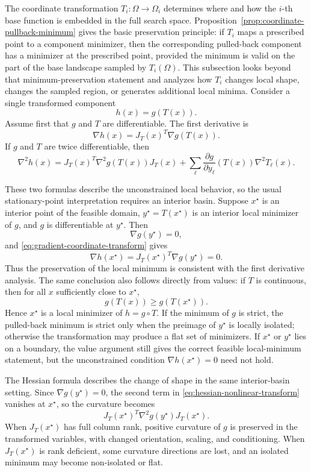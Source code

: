 \documentclass[11pt,a4paper]{article}
\theoremstyle{remark}
\theoremstyle{plain}
\begin{document}
The coordinate transformation \(T_i:\Omega\to\Omega_i\) determines where and how
the \(i\)-th base function is embedded in the full search space.
Proposition~\ref{prop:coordinate-pullback-minimum} gives the basic preservation
principle: if \(T_i\) maps a prescribed point to a component minimizer, then
the corresponding pulled-back component has a minimizer at the prescribed
point, provided the minimum is valid on the part of the base landscape sampled
by \(T_i(\Omega)\). This subsection looks beyond that minimum-preservation
statement and analyzes how \(T_i\) changes local shape, changes the sampled
region, or generates additional local minima.
Consider a single transformed component
\[
h(x)=g(T(x)).
\]
Assume first that \(g\) and \(T\) are differentiable. The first derivative is
\begin{equation}
	\nabla h(x)=J_T(x)^T\nabla g(T(x)).
	\label{eq:gradient-coordinate-transform}
\end{equation}
If \(g\) and \(T\) are twice differentiable, then
\begin{equation}
	\nabla^2 h(x)
	=
	J_T(x)^T\nabla^2 g(T(x))J_T(x)
	+
	\sum_{\ell}
	\frac{\partial g}{\partial y_\ell}(T(x))\nabla^2 T_\ell(x).
	\label{eq:hessian-nonlinear-transform}
\end{equation}

These two formulas describe the unconstrained local behavior, so the usual
stationary-point interpretation requires an interior basin. Suppose
\(x^\star\) is an interior point of the feasible domain, \(y^\star=T(x^\star)\)
is an interior local minimizer of \(g\), and \(g\) is differentiable at
\(y^\star\). Then
\[
	\nabla g(y^\star)=0,
\]
and \eqref{eq:gradient-coordinate-transform} gives
\[
	\nabla h(x^\star)
	=
	J_T(x^\star)^T\nabla g(y^\star)
	=
	0.
\]
Thus the preservation of the local minimum is consistent with the first
derivative analysis. The same conclusion also follows directly from values: if
\(T\) is continuous, then for all \(x\) sufficiently close to \(x^\star\),
\[
g(T(x))\ge g(T(x^\star)).
\]
Hence \(x^\star\) is a local minimizer of \(h=g\circ T\). If the minimum of
\(g\) is strict, the pulled-back minimum is strict only when the preimage of
\(y^\star\) is locally isolated; otherwise the transformation may produce a
flat set of minimizers. If \(x^\star\) or \(y^\star\) lies on a boundary, the
value argument still gives the correct feasible local-minimum statement, but
the unconstrained condition \(\nabla h(x^\star)=0\) need not hold.

The Hessian formula describes the change of shape in the same interior-basin
setting. Since \(\nabla g(y^\star)=0\), the second term in
\eqref{eq:hessian-nonlinear-transform} vanishes at \(x^\star\), so the
curvature becomes
\[
J_T(x^\star)^T\nabla^2 g(y^\star)J_T(x^\star).
\]
When \(J_T(x^\star)\) has full column rank, positive curvature of \(g\) is
preserved in the transformed variables, with changed orientation, scaling, and
conditioning. When \(J_T(x^\star)\) is rank deficient, some curvature directions
are lost, and an isolated minimum may become non-isolated or flat.
\end{document}
